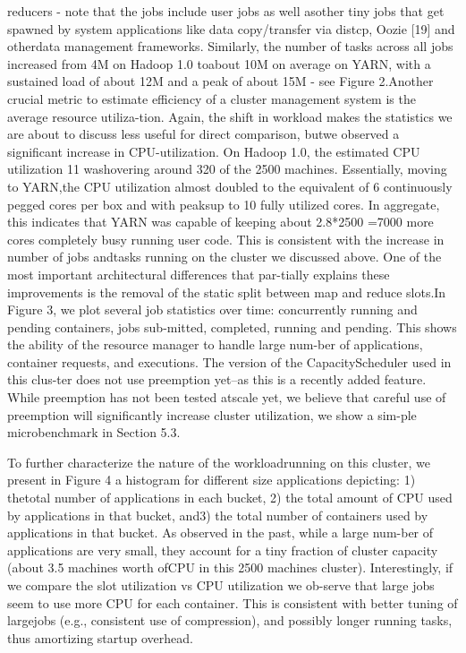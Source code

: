 reducers - note that the jobs include user jobs as well asother tiny jobs that get spawned by system applications
like data copy/transfer via distcp, Oozie [19] and otherdata management frameworks. Similarly, the number of
tasks across all jobs increased from 4M on Hadoop 1.0 toabout 10M on average on YARN, with a sustained load
of about 12M and a peak of about 15M - see Figure 2.Another crucial metric to estimate efficiency of a cluster management system is the average resource utiliza-tion. Again, the shift in workload makes the statistics we
are about to discuss less useful for direct comparison, butwe observed a significant increase in CPU-utilization.
On Hadoop 1.0, the estimated CPU utilization 11 washovering around 320%
of the 2500 machines. Essentially, moving to YARN,the CPU utilization almost doubled to the equivalent
of 6 continuously pegged cores per box and with peaksup to 10 fully utilized cores. In aggregate, this indicates
that YARN was capable of keeping about 2.8*2500 =7000 more cores completely busy running user code.
This is consistent with the increase in number of jobs andtasks running on the cluster we discussed above. One
of the most important architectural differences that par-tially explains these improvements is the removal of the
static split between map and reduce slots.In Figure 3, we plot several job statistics over time:
concurrently running and pending containers, jobs sub-mitted, completed, running and pending. This shows the
ability of the resource manager to handle large num-ber of applications, container requests, and executions.
The version of the CapacityScheduler used in this clus-ter does not use preemption yet--as this is a recently
added feature. While preemption has not been tested atscale yet, we believe that careful use of preemption will
significantly increase cluster utilization, we show a sim-ple microbenchmark in Section 5.3.

To further characterize the nature of the workloadrunning on this cluster, we present in Figure 4 a histogram for different size applications depicting: 1) thetotal number of applications in each bucket, 2) the total
amount of CPU used by applications in that bucket, and3) the total number of containers used by applications in
that bucket. As observed in the past, while a large num-ber of applications are very small, they account for a tiny
fraction of cluster capacity (about 3.5 machines worth ofCPU in this 2500 machines cluster). Interestingly, if we
compare the slot utilization vs CPU utilization we ob-serve that large jobs seem to use more CPU for each
container. This is consistent with better tuning of largejobs (e.g., consistent use of compression), and possibly
longer running tasks, thus amortizing startup overhead.

